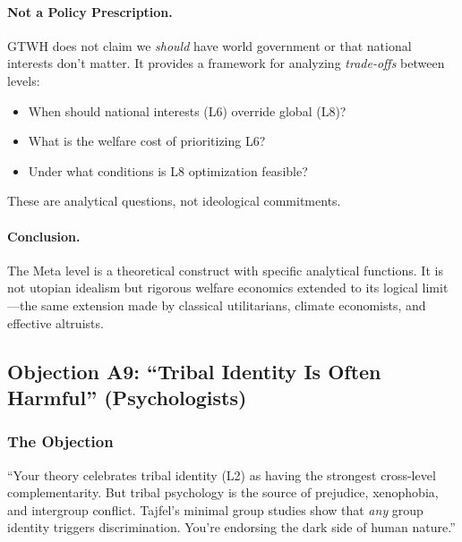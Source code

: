 \documentclass[12pt,a4paper]{article}
\begin{document}
\paragraph{Not a Policy Prescription.}

GTWH does not claim we \textit{should} have world government or that national 
interests don't matter. It provides a framework for analyzing \textit{trade-offs} 
between levels:
\begin{itemize}[nosep]
\item When should national interests (L6) override global (L8)?
\item What is the welfare cost of prioritizing L6?
\item Under what conditions is L8 optimization feasible?
\end{itemize}

These are analytical questions, not ideological commitments.

\paragraph{Conclusion.}

The Meta level is a theoretical construct with specific analytical functions. 
It is not utopian idealism but rigorous welfare economics extended to its 
logical limit---the same extension made by classical utilitarians, climate 
economists, and effective altruists.

\subsection{Objection A9: ``Tribal Identity Is Often Harmful'' (Psychologists)}
\label{app:tribal-harm}

\subsubsection{The Objection}

\begin{tcolorbox}[colback=red!5!white, colframe=red!75!black, title=Psychologist's Objection]
``Your theory celebrates tribal identity (L2) as having the strongest 
cross-level complementarity. But tribal psychology is the source of 
prejudice, xenophobia, and intergroup conflict. Tajfel's minimal group 
studies show that \textit{any} group identity triggers discrimination. 
You're endorsing the dark side of human nature.''
\end{tcolorbox}
\end{document}
